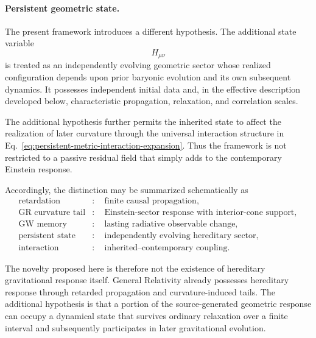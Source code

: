 \paragraph{Persistent geometric state.}

The present framework introduces a different hypothesis. The additional state
variable
\begin{equation}
    H_{\mu\nu}
\end{equation}
is treated as an independently evolving geometric sector whose realized
configuration depends upon prior baryonic evolution and its own subsequent
dynamics. It possesses independent initial data and, in the effective
description developed below, characteristic propagation, relaxation, and
correlation scales.

The additional hypothesis further permits the inherited state to affect the
realization of later curvature through the universal interaction structure in
Eq.~\eqref{eq:persistent-metric-interaction-expansion}. Thus the framework is not
restricted to a passive residual field that simply adds to the contemporary
Einstein response.

Accordingly, the distinction may be summarized schematically as
\begin{equation}
\begin{aligned}
    \text{retardation}
    &:\quad
    \text{finite causal propagation},
    \\
    \text{GR curvature tail}
    &:\quad
    \text{Einstein-sector response with interior-cone support},
    \\
    \text{GW memory}
    &:\quad
    \text{lasting radiative observable change},
    \\
    \text{persistent state}
    &:\quad
    \text{independently evolving hereditary sector},
    \\
    \text{interaction}
    &:\quad
    \text{inherited--contemporary coupling}.
\end{aligned}
\label{eq:five-way-distinction}
\end{equation}

The novelty proposed here is therefore not the existence of hereditary
gravitational response itself. General Relativity already possesses hereditary
response through retarded propagation and curvature-induced tails. The
additional hypothesis is that a portion of the source-generated geometric
response can occupy a dynamical state that survives ordinary relaxation over a
finite interval and subsequently participates in later gravitational evolution.

